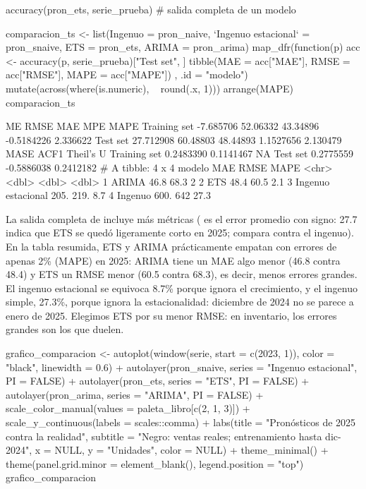 \begin{rcode}
accuracy(pron_ets, serie_prueba)   # salida completa de un modelo

comparacion_ts <- list(Ingenuo = pron_naive,
                       `Ingenuo estacional` = pron_snaive,
                       ETS = pron_ets, ARIMA = pron_arima) %
  map_dfr(function(p) {
    acc <- accuracy(p, serie_prueba)["Test set", ]
    tibble(MAE = acc["MAE"], RMSE = acc["RMSE"], MAPE = acc["MAPE"])
  }, .id = "modelo") %
  mutate(across(where(is.numeric), ~ round(.x, 1))) %
  arrange(MAPE)
comparacion_ts
\end{rcode}

\begin{rsalida}
                    ME     RMSE      MAE        MPE     MAPE
Training set -7.685706 52.06332 43.34896 -0.5184226 2.336622
Test set     27.712908 60.48803 48.44893  1.1527656 2.130479
                  MASE       ACF1 Theil's U
Training set 0.2483390  0.1141467        NA
Test set     0.2775559 -0.5886038 0.2412182
# A tibble: 4 x 4
  modelo               MAE  RMSE  MAPE
  <chr>              <dbl> <dbl> <dbl>
1 ARIMA               46.8  68.3   2  
2 ETS                 48.4  60.5   2.1
3 Ingenuo estacional 205.  219.    8.7
4 Ingenuo            600.  642    27.3
\end{rsalida}

La salida completa de  incluye más métricas (
es el error promedio con signo: 27.7 indica que ETS se quedó ligeramente corto
en 2025;  compara contra el ingenuo). En la tabla resumida, ETS y
ARIMA prácticamente empatan con errores de apenas 2\% (MAPE) en 2025: ARIMA
tiene un MAE algo menor (46.8 contra 48.4) y ETS un RMSE menor (60.5 contra
68.3), es decir, menos errores grandes. El ingenuo estacional se equivoca 8.7\%
porque ignora el crecimiento, y el ingenuo simple, 27.3\%, porque ignora la
estacionalidad: diciembre de 2024 no se parece a enero de 2025. Elegimos ETS
por su menor RMSE: en inventario, los errores grandes son los que duelen.

\begin{rcode}
grafico_comparacion <- autoplot(window(serie, start = c(2023, 1)),
                                color = "black", linewidth = 0.6) +
  autolayer(pron_snaive, series = "Ingenuo estacional", PI = FALSE) +
  autolayer(pron_ets, series = "ETS", PI = FALSE) +
  autolayer(pron_arima, series = "ARIMA", PI = FALSE) +
  scale_color_manual(values = paleta_libro[c(2, 1, 3)]) +
  scale_y_continuous(labels = scales::comma) +
  labs(title = "Pronósticos de 2025 contra la realidad",
       subtitle = "Negro: ventas reales; entrenamiento hasta dic-2024",
       x = NULL, y = "Unidades", color = NULL) +
  theme_minimal() +
  theme(panel.grid.minor = element_blank(), legend.position = "top")
grafico_comparacion
\end{rcode}

